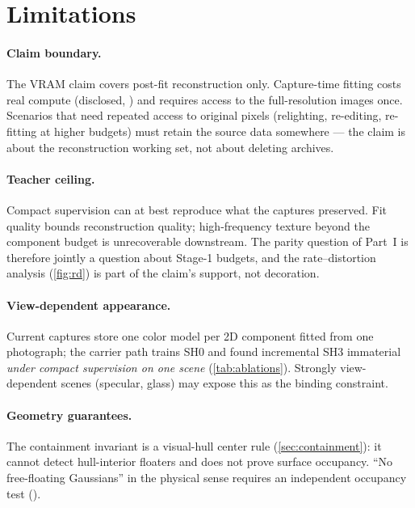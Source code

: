 \section{Limitations}
\label{sec:limitations}

\paragraph{Claim boundary.}
The VRAM claim covers post-fit reconstruction only.  Capture-time fitting costs real compute
(disclosed, ) and requires access to the full-resolution images
once.  Scenarios that need repeated access to original pixels (relighting, re-editing,
re-fitting at higher budgets) must retain the source data somewhere --- the claim is about
the reconstruction working set, not about deleting archives.

\paragraph{Teacher ceiling.}
Compact supervision can at best reproduce what the captures preserved.  Fit quality bounds
reconstruction quality; high-frequency texture beyond the component budget is unrecoverable
downstream.  The parity question of Part~I is therefore jointly a question about Stage-1
budgets, and the rate--distortion analysis (\cref{fig:rd}) is part of the claim's support,
not decoration.

\paragraph{View-dependent appearance.}
Current captures store one color model per 2D component fitted from one photograph; the
carrier path trains SH0 and found incremental SH3 immaterial \emph{under compact
supervision on one scene} (\cref{tab:ablations}).  Strongly view-dependent scenes
(specular, glass) may expose this as the binding constraint.

\paragraph{Geometry guarantees.}
The containment invariant is a visual-hull center rule (\cref{sec:containment}): it cannot
detect hull-interior floaters and does not prove surface occupancy.  ``No free-floating
Gaussians'' in the physical sense requires an independent occupancy test
().

